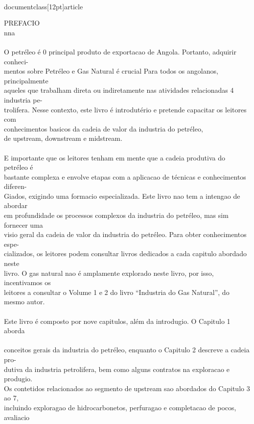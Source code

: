 \\documentclass[12pt]{article}
\begin{document}
{PREFACIO\\
nna\\
\\
O petréleo é 0 principal produto de exportacao de Angola. Portanto, adquirir conheci-\\
mentos sobre Petréleo e Gas Natural é crucial Para todos os angolanos, principalmente\\
aqueles que trabalham direta ou indiretamente nas atividades relacionadas 4 industria pe-\\
trolifera. Nesse contexto, este livro é introdutério e pretende capacitar os leitores com\\
conhecimentos basicos da cadeia de valor da industria do petréleo,\\
de upstream, downstream e midstream.\\
\\
E importante que os leitores tenham em mente que a cadeia produtiva do petréleo é\\
bastante complexa e envolve etapas com a aplicacao de técnicas e conhecimentos diferen-\\
Giados, exigindo uma formacio especializada. Este livro nao tem a intengao de abordar\\
em profundidade os processos complexos da industria do petréleo, mas sim fornecer uma\\
visio geral da cadeia de valor da industria do petréleo. Para obter conhecimentos espe-\\
cializados, os leitores podem consultar livros dedicados a cada capitulo abordado neste\\
livro. O gas natural nao é amplamente explorado neste livro, por isso, incentivamos os\\
leitores a consultar o Volume 1 e 2 do livro “Industria do Gas Natural”, do mesmo autor.\\
\\
Este livro é composto por nove capitulos, além da introdugio. O Capitulo 1 aborda\\
\\
conceitos gerais da industria do petréleo, enquanto o Capitulo 2 descreve a cadeia pro-\\
dutiva da industria petrolifera, bem como alguns contratos na exploracao e produgio.\\
Os contetidos relacionados ao segmento de upstream sao abordados do Capitulo 3 ao 7,\\
incluindo exploragao de hidrocarbonetos, perfuragao e completacao de pocos, avaliacio\\
}
\end{document}
